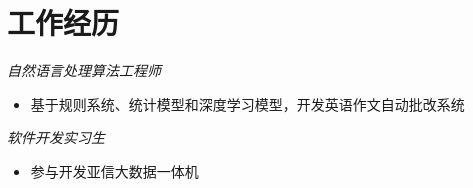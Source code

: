 \section{工作经历}
\textit{自然语言处理算法工程师}
\begin{itemize}
  \item 基于规则系统、统计模型和深度学习模型，开发英语作文自动批改系统
\end{itemize}

\textit{软件开发实习生}
\begin{itemize}
  \item 参与开发亚信大数据一体机
\end{itemize}

